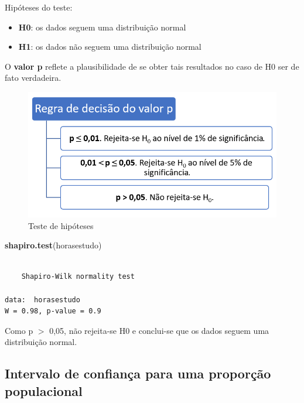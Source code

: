 \documentclass[12pt,portuguese,oneside]{book}
\newenvironment{Shaded}{\begin{snugshade}}{\end{snugshade}}
\newcommand{\KeywordTok}[1]{\textcolor[rgb]{0.13,0.29,0.53}{\textbf{#1}}}
\newcommand{\NormalTok}[1]{#1}
\providecommand{\tightlist}{%
  \setlength{\itemsep}{0pt}\setlength{\parskip}{0pt}}
\begin{document}
Hipóteses do teste:

\begin{itemize}
\tightlist
\item
  \textbf{H0}: os dados seguem uma distribuição normal
\item
  \textbf{H1}: os dados não seguem uma distribuição normal
\end{itemize}

O \textbf{valor p} reflete a plausibilidade de se obter tais resultados
no caso de H0 ser de fato verdadeira.

\begin{figure}[H]

{\centering \includegraphics[width=0.8\linewidth]{testehip1} 

}

\caption{Teste de hipóteses}\label{fig:testehip1}
\end{figure}

\begin{Shaded}
\begin{Highlighting}[]
\KeywordTok{shapiro.test}\NormalTok{(horasestudo)}
\end{Highlighting}
\end{Shaded}

\begin{verbatim}

    Shapiro-Wilk normality test

data:  horasestudo
W = 0.98, p-value = 0.9
\end{verbatim}

Como p \(>\) 0,05, não rejeita-se H0 e conclui-se que os dados seguem
uma distribuição normal.

\subsection{Intervalo de confiança para uma proporção
populacional}\label{intervalo-de-confianca-para-uma-proporcao-populacional}
\end{document}
